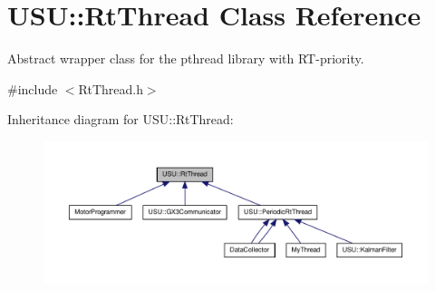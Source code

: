 \hypertarget{class_u_s_u_1_1_rt_thread}{\section{\-U\-S\-U\-:\-:\-Rt\-Thread \-Class \-Reference}
\label{class_u_s_u_1_1_rt_thread}
}


\-Abstract wrapper class for the pthread library with \-R\-T-\/priority.  




{\ttfamily \#include $<$\-Rt\-Thread.\-h$>$}



\-Inheritance diagram for \-U\-S\-U\-:\-:\-Rt\-Thread\-:\nopagebreak
\begin{figure}[H]
\begin{center}
\leavevmode
\includegraphics[width=350pt]{class_u_s_u_1_1_rt_thread__inherit__graph}
\end{center}
\end{figure}
